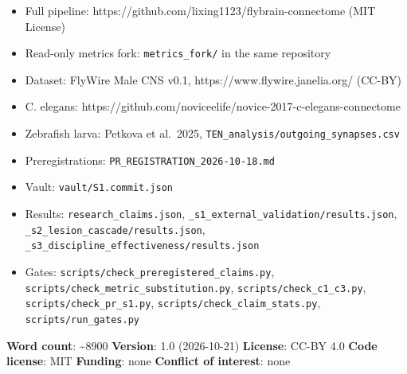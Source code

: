 \documentclass[
]{article}
\newcounter{none} %
\providecommand{\tightlist}{%
  \setlength{\itemsep}{0pt}\setlength{\parskip}{0pt}}
\begin{document}
\begin{itemize}
\tightlist
\item
  Full pipeline: https://github.com/lixing1123/flybrain-connectome (MIT
  License)
\item
  Read-only metrics fork: \texttt{metrics\_fork/} in the same repository
\item
  Dataset: FlyWire Male CNS v0.1, https://www.flywire.janelia.org/
  (CC-BY)
\item
  C. elegans:
  https://github.com/noviceelife/novice-2017-c-elegans-connectome
\item
  Zebrafish larva: Petkova et al.~2025,
  \texttt{TEN\_analysis/outgoing\_synapses.csv}
\item
  Preregistrations: \texttt{PR\_REGISTRATION\_2026-10-18.md}
\item
  Vault: \texttt{vault/S1.commit.json}
\item
  Results: \texttt{research\_claims.json},
  \texttt{\_s1\_external\_validation/results.json},
  \texttt{\_s2\_lesion\_cascade/results.json},
  \texttt{\_s3\_discipline\_effectiveness/results.json}
\item
  Gates: \texttt{scripts/check\_preregistered\_claims.py},
  \texttt{scripts/check\_metric\_substitution.py},
  \texttt{scripts/check\_c1\_c3.py}, \texttt{scripts/check\_pr\_s1.py},
  \texttt{scripts/check\_claim\_stats.py},
  \texttt{scripts/run\_gates.py}
\end{itemize}

\textbf{Word count}: \textasciitilde8900 \textbf{Version}: 1.0
(2026-10-21) \textbf{License}: CC-BY 4.0 \textbf{Code license}: MIT
\textbf{Funding}: none \textbf{Conflict of interest}: none


\end{document}
